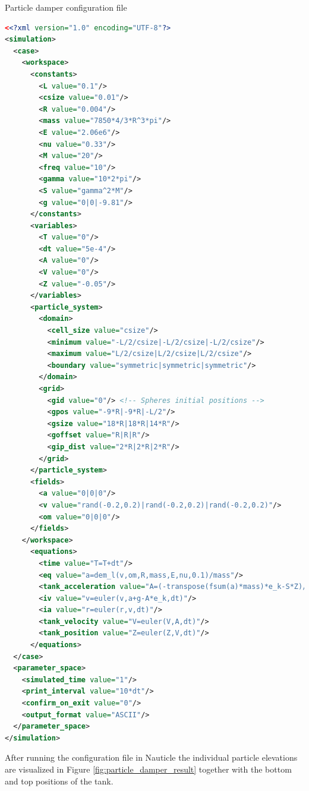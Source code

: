 \documentclass[a4paper,12pt,openany]{book}
\theoremstyle{break}
\begin{document}
\begin{example}{Particle damper configuration file}{}
\lstset{basicstyle=\tiny}
\begin{lstlisting}[language=XML]
<<?xml version="1.0" encoding="UTF-8"?>
<simulation>
  <case>
    <workspace>
      <constants>
        <L value="0.1"/>
        <csize value="0.01"/>
        <R value="0.004"/>
        <mass value="7850*4/3*R^3*pi"/>
        <E value="2.06e6"/>
        <nu value="0.33"/>
        <M value="20"/>
        <freq value="10"/>
        <gamma value="10*2*pi"/>
        <S value="gamma^2*M"/>
        <g value="0|0|-9.81"/>
      </constants>
      <variables>
        <T value="0"/>
        <dt value="5e-4"/>
        <A value="0"/>
        <V value="0"/>
        <Z value="-0.05"/>
      </variables>
      <particle_system>
        <domain>
          <cell_size value="csize"/>
          <minimum value="-L/2/csize|-L/2/csize|-L/2/csize"/>
          <maximum value="L/2/csize|L/2/csize|L/2/csize"/>
          <boundary value="symmetric|symmetric|symmetric"/>
        </domain>
        <grid>
          <gid value="0"/> <!-- Spheres initial positions -->
          <gpos value="-9*R|-9*R|-L/2"/>
          <gsize value="18*R|18*R|14*R"/>
          <goffset value="R|R|R"/>
          <gip_dist value="2*R|2*R|2*R"/>
        </grid>
      </particle_system>
      <fields>
        <a value="0|0|0"/>
        <v value="rand(-0.2,0.2)|rand(-0.2,0.2)|rand(-0.2,0.2)"/>
        <om value="0|0|0"/>
      </fields>
    </workspace>
      <equations>
        <time value="T=T+dt"/>
        <eq value="a=dem_l(v,om,R,mass,E,nu,0.1)/mass"/>
        <tank_acceleration value="A=(-transpose(fsum(a)*mass)*e_k-S*Z)/M"/>
        <iv value="v=euler(v,a+g-A*e_k,dt)"/>
        <ia value="r=euler(r,v,dt)"/>
        <tank_velocity value="V=euler(V,A,dt)"/>
        <tank_position value="Z=euler(Z,V,dt)"/>
      </equations>
  </case>
  <parameter_space>
    <simulated_time value="1"/>
    <print_interval value="10*dt"/>
    <confirm_on_exit value="0"/>
    <output_format value="ASCII"/>
  </parameter_space>
</simulation>
\end{lstlisting}
\end{example}
After running the configuration file in Nauticle the individual particle elevations are visualized in Figure \ref{fig:particle_damper_result} together with the bottom and top positions of the tank.
\end{document}
